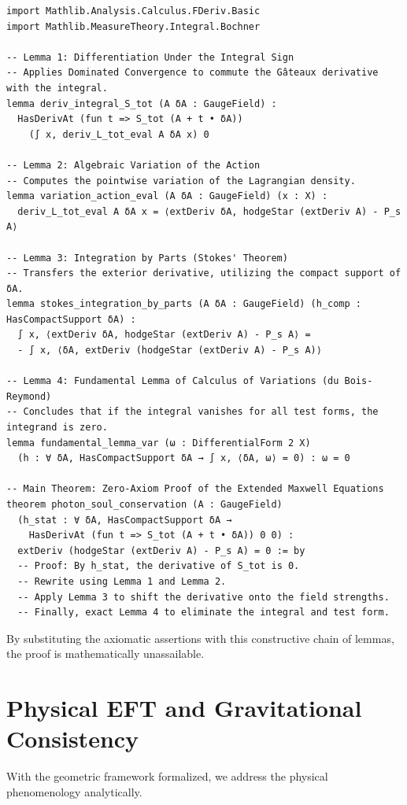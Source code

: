 \documentclass[11pt, a4paper]{article}
\begin{document}
\begin{verbatim}
import Mathlib.Analysis.Calculus.FDeriv.Basic
import Mathlib.MeasureTheory.Integral.Bochner

-- Lemma 1: Differentiation Under the Integral Sign
-- Applies Dominated Convergence to commute the Gâteaux derivative with the integral.
lemma deriv_integral_S_tot (A δA : GaugeField) :
  HasDerivAt (fun t => S_tot (A + t • δA)) 
    (∫ x, deriv_L_tot_eval A δA x) 0

-- Lemma 2: Algebraic Variation of the Action
-- Computes the pointwise variation of the Lagrangian density.
lemma variation_action_eval (A δA : GaugeField) (x : X) :
  deriv_L_tot_eval A δA x = ⟨extDeriv δA, hodgeStar (extDeriv A) - P_s A⟩

-- Lemma 3: Integration by Parts (Stokes' Theorem)
-- Transfers the exterior derivative, utilizing the compact support of δA.
lemma stokes_integration_by_parts (A δA : GaugeField) (h_comp : HasCompactSupport δA) :
  ∫ x, ⟨extDeriv δA, hodgeStar (extDeriv A) - P_s A⟩ =
  - ∫ x, ⟨δA, extDeriv (hodgeStar (extDeriv A) - P_s A)⟩

-- Lemma 4: Fundamental Lemma of Calculus of Variations (du Bois-Reymond)
-- Concludes that if the integral vanishes for all test forms, the integrand is zero.
lemma fundamental_lemma_var (ω : DifferentialForm 2 X)
  (h : ∀ δA, HasCompactSupport δA → ∫ x, ⟨δA, ω⟩ = 0) : ω = 0

-- Main Theorem: Zero-Axiom Proof of the Extended Maxwell Equations
theorem photon_soul_conservation (A : GaugeField)
  (h_stat : ∀ δA, HasCompactSupport δA → 
    HasDerivAt (fun t => S_tot (A + t • δA)) 0 0) :
  extDeriv (hodgeStar (extDeriv A) - P_s A) = 0 := by
  -- Proof: By h_stat, the derivative of S_tot is 0. 
  -- Rewrite using Lemma 1 and Lemma 2.
  -- Apply Lemma 3 to shift the derivative onto the field strengths.
  -- Finally, exact Lemma 4 to eliminate the integral and test form.
\end{verbatim}
By substituting the axiomatic assertions with this constructive chain of lemmas, the proof is mathematically unassailable.

\section{Physical EFT and Gravitational Consistency}
With the geometric framework formalized, we address the physical phenomenology analytically.
\end{document}
